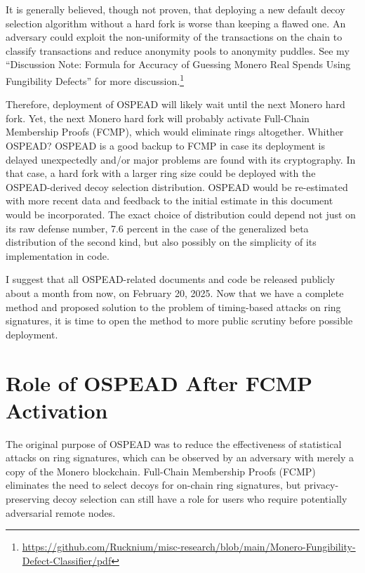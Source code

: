 \documentclass[english]{article}
\begin{document}
It is generally believed, though not proven, that deploying a new
default decoy selection algorithm without a hard fork is worse than
keeping a flawed one. An adversary could exploit the non-uniformity
of the transactions on the chain to classify transactions and reduce
anonymity pools to anonymity puddles. See my ``Discussion Note: Formula
for Accuracy of Guessing Monero Real Spends Using Fungibility Defects''
for more discussion.\footnote{\href{https://github.com/Rucknium/misc-research/blob/main/Monero-Fungibility-Defect-Classifier/pdf}{https://github.com/Rucknium/misc-research/blob/main/Monero-Fungibility-Defect-Classifier/pdf}}

Therefore, deployment of OSPEAD will likely wait until the next Monero
hard fork. Yet, the next Monero hard fork will probably activate Full-Chain
Membership Proofs (FCMP), which would eliminate rings altogether.
Whither OSPEAD? OSPEAD is a good backup to FCMP in case its deployment
is delayed unexpectedly and/or major problems are found with its cryptography.
In that case, a hard fork with a larger ring size could be deployed
with the OSPEAD-derived decoy selection distribution. OSPEAD would
be re-estimated with more recent data and feedback to the initial
estimate in this document would be incorporated. The exact choice
of distribution could depend not just on its raw defense number, 7.6
percent in the case of the generalized beta distribution of the second
kind, but also possibly on the simplicity of its implementation in
code.

I suggest that all OSPEAD-related documents and code be released publicly
about a month from now, on February 20, 2025. Now that we have a complete
method and proposed solution to the problem of timing-based attacks
on ring signatures, it is time to open the method to more public scrutiny
before possible deployment.

\section*{Role of OSPEAD After FCMP Activation}

The original purpose of OSPEAD was to reduce the effectiveness of
statistical attacks on ring signatures, which can be observed by an
adversary with merely a copy of the Monero blockchain. Full-Chain
Membership Proofs (FCMP) eliminates the need to select decoys for
on-chain ring signatures, but privacy-preserving decoy selection can
still have a role for users who require potentially adversarial remote
nodes.
\end{document}
